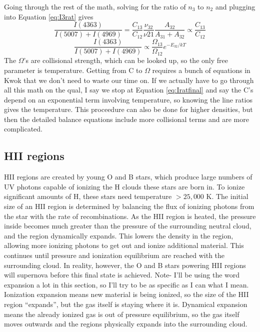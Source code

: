 Going through the rest of the math, solving for the ratio of $n_3$ to $n_2$ and plugging into 
Equation \ref{eq:I3rat} gives
\begin{equation}\label{eq:Iratfinal}
\frac{I(4363)}{I(5007)+I(4969)}=\frac{C_13}{C_12}\frac{\nu_{32}}{\nu{21}}\frac{A_{32}}{A_{31}+A_{32}}\propto\frac{C_13}{C_12}
\end{equation}
\begin{equation}
\frac{I(4363)}{I(5007)+I(4969)}\propto\frac{\Omega_{13}}{\Omega_12}e^{-E_{32}/kT}
\end{equation}
The $\Omega$'s are collisional strength, which can be looked up, so the only free parameter is 
temperature.  Getting from C to $\Omega$ requires a bunch of equations in Kwok that we don't need 
to waste our time on.  If we actually have to go through all this math on the qual, I say 
we stop at Equation \ref{eq:Iratfinal} and say the C's depend on an exponential term involving 
temperature, so knowing the line ratios gives the temperature.  This proceedure can also be 
done for higher densities, but then the detailed balance equations include more collisional terms 
and are more complicated.  

\subsection{HII regions}
HII regions are created by young O and B stars, which produce large numbers of UV photons capable 
of ionizing the H clouds these stars are born in.  To ionize significant amounts of H, these 
stars need temperature $>25,000$ K.  The initial size of an HII region is determined by 
balancing the flux of ionizing photons from the star with the rate of recombinations.  As the 
HII region is heated, the pressure inside becomes much greater than the pressure of the 
surrounding neutral cloud, and the region dynamically expands.  This lowers the density in the 
region, allowing more ionizing photons to get out and ionize additional material.  This continues 
until pressure and ionization equilibrium are reached with the surrounding cloud.  In reality, 
however, the O and B stars powering HII regions will supernova before this final state is 
achieved.  Note- I'll be using the word expansion a lot in this section, so I'll try to be as 
specific as I can what I mean.  Ionization expansion means new material is being ionized, so 
the size of the HII region ``expands'', but the gas itself is staying where it is.  Dynamical 
expansion means the already ionized gas is out of pressure equilibrium, so the gas itself moves 
outwards and the regions physically expands into the surrounding cloud.  

